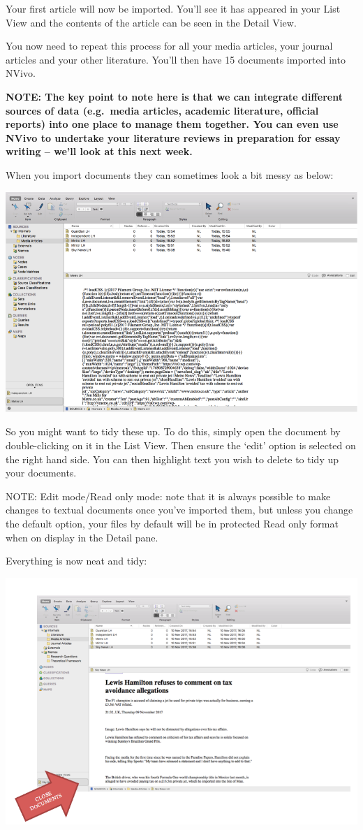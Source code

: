 \documentclass[]{book}
\theoremstyle{definition}
\theoremstyle{definition}
\theoremstyle{definition}
\theoremstyle{remark}
\begin{document}
Your first article will now be imported. You'll see it has appeared in
your List View and the contents of the article can be seen in the Detail
View.

You now need to repeat this process for all your media articles, your
journal articles and your other literature. You'll then have 15
documents imported into NVivo.

\textbf{NOTE: The key point to note here is that we can integrate
different sources of data (e.g.~media articles, academic literature,
official reports) into one place to manage them together. You can even
use NVivo to undertake your literature reviews in preparation for essay
writing -- we'll look at this next week.}

When you import documents they can sometimes look a bit messy as below:

\includegraphics{imgs/qual_16.png}

So you might want to tidy these up. To do this, simply open the document
by double-clicking on it in the List View. Then ensure the `edit' option
is selected on the right hand side. You can then highlight text you wish
to delete to tidy up your documents.

NOTE: Edit mode/Read only mode: note that it is always possible to make
changes to textual documents once you've imported them, but unless you
change the default option, your files by default will be in protected
Read only format when on display in the Detail pane.

Everything is now neat and tidy:

\includegraphics{imgs/qual_17.png}
\end{document}
